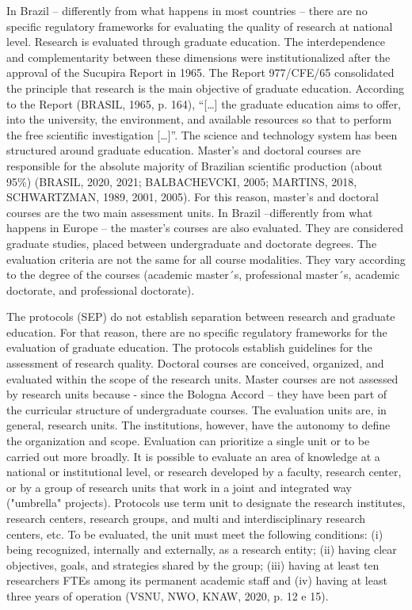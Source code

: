 In Brazil – differently from what happens in most countries – there are no specific regulatory frameworks for evaluating the quality of research at national level. Research is evaluated through graduate education. The interdependence and complementarity between these dimensions were institutionalized after the approval of the Sucupira Report in 1965. The Report 977/CFE/65 consolidated the principle that research is the main objective of graduate education. According to the 
Report (BRASIL, 1965, p. 164), “[…] the graduate education aims to offer, into the university, the environment, and available resources so that to perform the free scientific investigation […]”. The science and technology system has been structured around graduate education. Master’s and doctoral courses are responsible for the absolute majority of Brazilian scientific production (about 95\%) (BRASIL, 2020, 2021; BALBACHEVCKI, 2005; MARTINS, 2018, SCHWARTZMAN, 1989, 2001, 2005). For this reason, master's and doctoral courses are the two main assessment units. In Brazil –differently from what happens in Europe – the master’s courses are also evaluated. They are considered graduate studies, placed between undergraduate and doctorate degrees. The evaluation criteria are not the same for all course modalities. They vary according to the degree of the courses (academic master´s, professional master´s, academic doctorate, and professional doctorate). 

The protocols (SEP) do not establish separation between research and graduate education. For that reason, there are no specific regulatory frameworks for the evaluation of graduate education. The protocols establish guidelines for the assessment of research quality. Doctoral courses are conceived, organized, and evaluated within the scope of the research units. Master courses are not assessed by research units because - since the Bologna Accord – they have been part of the curricular structure of undergraduate courses. The evaluation units are, in general, research units. The institutions, however, have the autonomy to define the organization and scope. Evaluation can prioritize a single unit or to be carried out more broadly. It is possible to evaluate an area of knowledge at a national or institutional level, or research developed by a faculty, research center, or by a group of research units that work in a joint and integrated way ("umbrella" projects). Protocols use term unit to designate the research institutes, research centers, research groups, and multi and interdisciplinary research centers, etc. To be evaluated, the unit must meet the following conditions: (i) being recognized, internally and externally, as a research entity; (ii) having clear objectives, goals, and strategies shared by the group; (iii) having at least ten researchers FTEs among its permanent academic staff and (iv) having at least three years of operation (VSNU, NWO, KNAW, 
2020, p. 12 e 15).     

